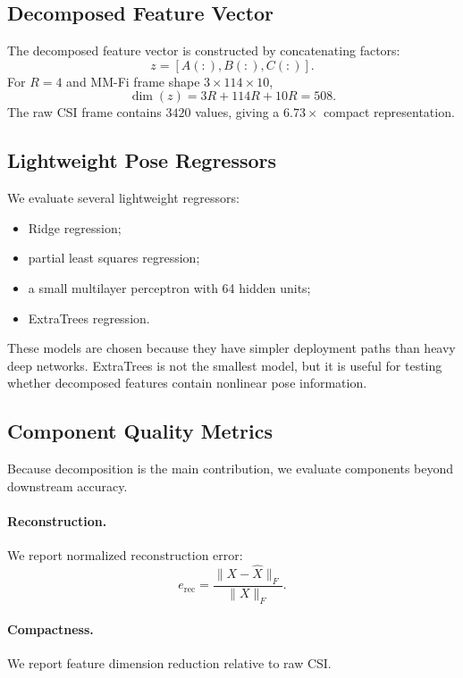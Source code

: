 \documentclass[letterpaper]{article}
\begin{document}
\subsection{Decomposed Feature Vector}

The decomposed feature vector is constructed by concatenating factors:
\begin{equation}
    z = [A(:), B(:), C(:)].
\end{equation}
For $R=4$ and MM-Fi frame shape $3\times114\times10$,
\begin{equation}
    \dim(z) = 3R + 114R + 10R = 508.
\end{equation}
The raw CSI frame contains $3420$ values, giving a $6.73\times$ compact representation.

\subsection{Lightweight Pose Regressors}

We evaluate several lightweight regressors:
\begin{itemize}
    \item Ridge regression;
    \item partial least squares regression;
    \item a small multilayer perceptron with 64 hidden units;
    \item ExtraTrees regression.
\end{itemize}
These models are chosen because they have simpler deployment paths than heavy deep networks. ExtraTrees is not the smallest model, but it is useful for testing whether decomposed features contain nonlinear pose information.

\subsection{Component Quality Metrics}

Because decomposition is the main contribution, we evaluate components beyond downstream accuracy.

\paragraph{Reconstruction.}
We report normalized reconstruction error:
\begin{equation}
    e_{\mathrm{rec}}
    =
    \frac{\|X-\hat{X}\|_F}{\|X\|_F}.
\end{equation}

\paragraph{Compactness.}
We report feature dimension reduction relative to raw CSI.
\end{document}
